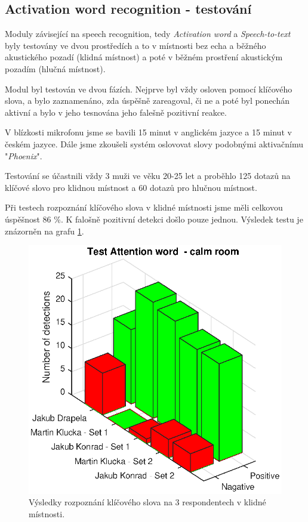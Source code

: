 \documentclass[12pt,a4paper]{article}
\begin{document}
\subsection{Activation word recognition - testování}
Moduly závisející na speech recognition, tedy \textit{Activation word} a \textit{Speech-to-text} byly testovány ve dvou prostředích a to v místnosti bez echa a běžného akustického pozadí (klidná místnost) a poté v běžném prostření akustickým pozadím (hlučná místnost). 

Modul byl testován ve dvou fázích. Nejprve byl vždy osloven pomocí klíčového slova, a bylo zaznamenáno, zda úspěšně zareagoval, či ne a poté byl ponechán aktivní a bylo v jeho tesnována jeho falešně pozitivní reakce. 

V blízkosti mikrofonu jsme se bavili 15 minut v anglickém jazyce a 15 minut v českém jazyce. Dále jsme zkoušeli systém oslovovat slovy podobnými aktivačnímu "\textit{Phoenix}".

 Testování se účastnili vždy 3 muži ve věku 20-25 let a proběhlo 125 dotazů na klíčové slovo pro klidnou místnost a 60 dotazů pro hlučnou místnost.
 
Při testech rozpoznání klíčového slova v klidné místnosti jsme měli celkovou úspěšnost 86 \%. K falošně pozitivní detekci došlo pouze jednou.  Výsledek testu je znázorněn na grafu \ref*{fig:AttentionWord}.

	\begin{figure}[ht]
		
		\centering
		\includegraphics[width = 12cm]{AtWr_test.eps}
		\caption{Výsledky rozpoznání klíčového slova na 3 respondentech v klidné místnosti.}
		\label{fig:AttentionWord}
	\end{figure}
	
\end{document}
